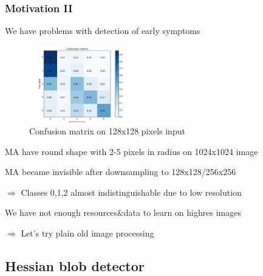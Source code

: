 \begin{frame}\frametitle{Motivation II}
\vspace{-0.7cm}
\par We have problems with detection of early symptoms
\par
\begin{figure}
\begin{center}
\vspace{-5pt}
\includegraphics[width=0.4\textwidth]{pics/submission_21_inner_squares_conv5_maxout.png}
\caption{Confusion matrix on 128x128 pixels input}
\vspace{-15pt}
\end{center}
\end{figure}

\par MA have round shape with 2-5 pixels in radius on 1024x1024 image 
\par MA became invisible after downsampling to 128x128/256x256
\par $\Rightarrow$ Classes 0,1,2 almost indistinguishable due to low resolution
\par We have not enough resources\&data to learn on highres images
\par $\Rightarrow$ Let's try plain old image processing
\end{frame}

\subsection{Hessian blob detector} 
\small

